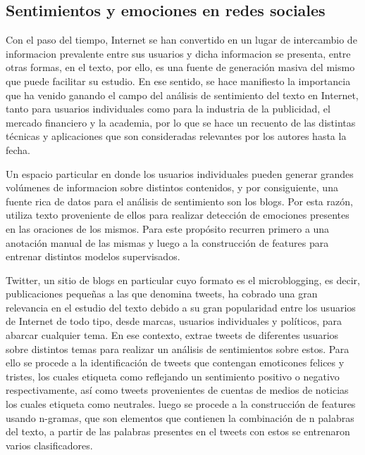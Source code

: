 \subsection{Sentimientos y emociones en redes sociales}

Con el paso del tiempo, Internet se han convertido en un lugar de intercambio de informacion prevalente entre sus usuarios y dicha informacion se presenta, entre otras formas, en el texto, por ello, es una fuente de generación masiva del mismo que puede facilitar su estudio. En ese sentido, \cite{pang2008opinion} se hace manifiesto la importancia que ha venido ganando el campo del análisis de sentimiento del texto en Internet, tanto para usuarios individuales como para la industria de la publicidad, el mercado financiero y la academia, por lo que se hace un recuento de las distintas técnicas y aplicaciones que son consideradas relevantes por los autores hasta la fecha.

Un espacio particular en donde los usuarios individuales pueden generar grandes volúmenes de informacion sobre distintos contenidos, y por consiguiente, una fuente rica de datos para el análisis de sentimiento son los blogs. Por esta razón, \cite{aman2007identifying} utiliza texto proveniente de ellos para realizar detección de emociones presentes en las oraciones de los mismos. Para este propósito recurren primero a una anotación manual de las mismas y luego a la construcción de features para entrenar distintos modelos supervisados. 

Twitter, un sitio de blogs en particular cuyo formato es el microblogging, es decir, publicaciones pequeñas a las que denomina tweets, ha cobrado una gran relevancia en el estudio del texto debido a su gran popularidad entre los usuarios de Internet de todo tipo, desde marcas, usuarios individuales y políticos, para abarcar cualquier tema. En ese contexto,  \cite{pak2010twitter} extrae tweets de diferentes usuarios sobre distintos temas para realizar un análisis de sentimientos sobre estos. Para ello se procede  a la identificación de tweets que contengan emoticones felices y tristes, los cuales etiqueta como reflejando un sentimiento positivo o negativo respectivamente, así como tweets provenientes de cuentas de medios de noticias los cuales etiqueta como neutrales. luego se procede a la construcción de features usando n-gramas, que son elementos que contienen la combinación de n palabras del texto, a partir de las palabras presentes en el tweets  con estos se entrenaron varios clasificadores. 

